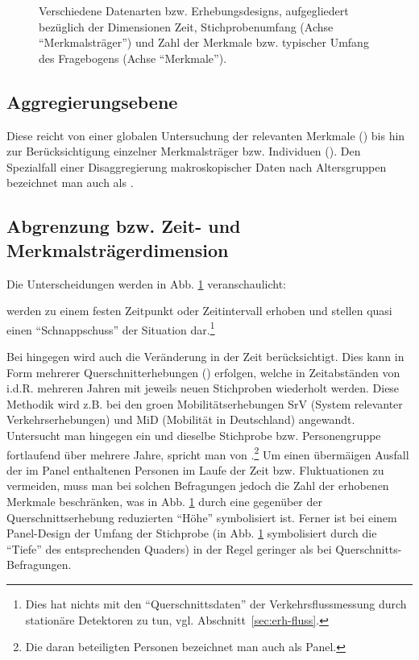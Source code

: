 \begin{figure}
\caption{\label{fig:Zeitdimension}Verschiedene Datenarten bzw. 
Erhebungsdesigns, aufgegliedert
bez\"uglich der Dimensionen Zeit, Stichprobenumfang (Achse
``Merkmalstr\"ager'') und Zahl der Merkmale bzw. typischer Umfang 
des Fragebogens (Achse ``Merkmale''). 
}
\end{figure}

\subsection{Aggregierungsebene} 
Diese reicht von einer globalen
Untersuchung der relevanten Merkmale ()
bis hin zur Ber\"ucksichtigung einzelner Merkmalstr\"ager
bzw. Individuen ().  Den Spezialfall einer
Disaggregierung makroskopischer Daten nach Altersgruppen bezeichnet
man auch als . 

\subsection{Abgrenzung bzw. Zeit- und Merkmalstr\"agerdimension} 

Die Unterscheidungen werden in Abb. \ref{fig:Zeitdimension} veranschaulicht:
\bi
\item
{} werden zu einem festen Zeitpunkt oder
Zeitintervall erhoben und stellen quasi einen ``Schnappschuss'' der
Situation dar.\footnote{Dies hat nichts mit den ``Querschnittsdaten''
  der Verkehrsflussmessung durch station\"are Detektoren zu tun,
  vgl. Abschnitt~\ref{sec:erh-fluss}.} 
\item
Bei  hingegen wird auch die Ver\"anderung
in der Zeit ber\"ucksich\-tigt. Dies kann in Form mehrerer
Querschnitterhebungen () erfolgen, welche in Zeitabst\"anden
von i.d.R. mehreren Jahren mit jeweils neuen Stichproben wiederholt werden. 
 Diese Methodik wird z.B.  bei den gro\3en
Mobilit\"atserhebungen SrV (System relevanter Verkehrserhebungen) und
MiD (Mobilit\"at in Deutschland) angewandt. Untersucht man hingegen
ein und dieselbe Stichprobe bzw. Personengruppe fortlaufend \"uber mehrere Jahre, spricht
man von .\footnote{Die daran beteiligten Personen bezeichnet
man auch als Panel.} Um einen \"uberm\"a\3igen Ausfall der 
 im Panel enthaltenen Personen im Laufe der Zeit bzw. Fluktuationen zu
vermeiden, muss man bei solchen Befragungen jedoch die Zahl der erhobenen
Merkmale beschr\"anken, was in Abb. \ref{fig:Zeitdimension} durch eine
gegen\"uber der Querschnittserhebung reduzierten ``H\"ohe''
symbolisiert ist. Ferner ist bei einem Panel-Design der Umfang 
 der Stichprobe (in Abb. \ref{fig:Zeitdimension} symbolisiert
durch die ``Tiefe'' des entsprechenden Quaders) in der Regel geringer
als bei Querschnitts-Befragungen.

